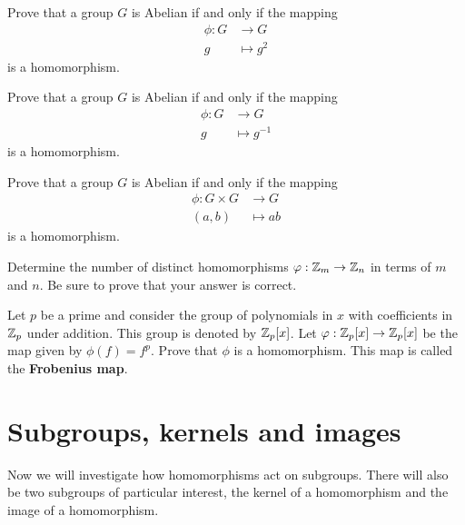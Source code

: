 \documentclass{ximera}
\begin{document}
\begin{exercise}
  Prove that a group $G$ is Abelian if and only if the mapping
  \begin{align*}
    \phi: G &\to G\\
    g &\mapsto g^2
  \end{align*}
  is a homomorphism.
\end{exercise}


\begin{exercise}
  Prove that a group $G$ is Abelian if and only if the mapping
  \begin{align*}
    \phi: G &\to G\\
    g &\mapsto g^{-1}
  \end{align*}
  is a homomorphism.
\end{exercise}

\begin{exercise}
  Prove that a group $G$ is Abelian if and only if the mapping
  \begin{align*}
    \phi: G\times G &\to G\\
    (a,b) &\mapsto ab
  \end{align*}
  is a homomorphism.
\end{exercise}


\begin{exercise}
  Determine the number of distinct homomorphisms $\varphi:\mathbb Z_m\to \mathbb Z_n$ in
  terms of $m$ and $n$. Be sure to prove that your answer is correct.
\end{exercise}

\begin{exercise}
  Let $p$ be a prime and consider the group of polynomials in $x$ with
  coefficients in $\mathbb Z_p$ under addition. This group is denoted by
  $\mathbb Z_p[x]$. Let $\varphi:\mathbb Z_p[x]\to\mathbb Z_p[x]$ be the map given by
  $\phi(f)=f^p$. Prove that $\phi$ is a homomorphism. This map is
  called the \textbf{Frobenius map}.
\end{exercise}




\section{Subgroups, kernels and images}


Now we will investigate how homomorphisms act on subgroups. There will
also be two subgroups of particular interest, the kernel of a
homomorphism and the image of a homomorphism.
\end{document}
